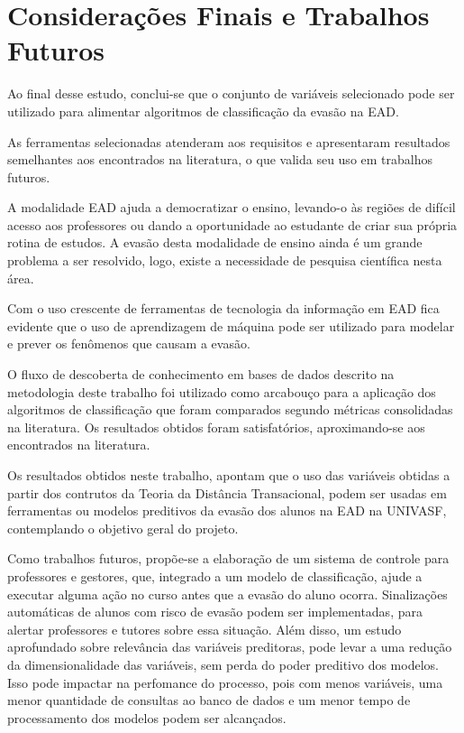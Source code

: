 \chapter{Considerações Finais e Trabalhos Futuros}

Ao final desse estudo, conclui-se que o conjunto de variáveis selecionado pode
ser utilizado para alimentar algoritmos de classificação da evasão na EAD.

As ferramentas selecionadas atenderam aos requisitos e apresentaram resultados
semelhantes aos encontrados na literatura, o que valida seu uso em trabalhos
futuros.

A modalidade EAD ajuda a democratizar o ensino, levando-o às regiões de difícil
acesso aos professores ou dando a oportunidade ao estudante de criar sua própria
rotina de estudos. A evasão desta modalidade de ensino ainda é um grande
problema a ser resolvido, logo, existe a necessidade de pesquisa científica
nesta área.

Com o uso crescente de ferramentas de tecnologia da informação em EAD fica
evidente que o uso de aprendizagem de máquina pode ser utilizado para modelar e
prever os fenômenos que causam a evasão.

O fluxo de descoberta de conhecimento em bases de dados descrito na metodologia
deste trabalho foi utilizado como arcabouço para a aplicação dos algoritmos de
classificação que foram comparados segundo métricas consolidadas na literatura.
Os resultados obtidos foram satisfatórios, aproximando-se aos encontrados na
literatura.

Os resultados obtidos neste trabalho, apontam que o uso das variáveis obtidas
a partir dos contrutos da Teoria da Distância Transacional, podem ser usadas
em ferramentas ou modelos preditivos da evasão dos alunos na EAD na UNIVASF,
contemplando o objetivo geral do projeto.

Como trabalhos futuros, propõe-se a elaboração de um sistema de controle para
professores e gestores, que, integrado a um modelo de classificação, ajude a
executar alguma ação no curso antes que a evasão do aluno ocorra. Sinalizações
automáticas de alunos com risco de evasão podem ser implementadas, para alertar
professores e tutores sobre essa situação. Além disso, um estudo aprofundado
sobre relevância das variáveis preditoras, pode levar a uma redução da
dimensionalidade das variáveis, sem perda do poder preditivo dos modelos. Isso
pode impactar na perfomance do processo, pois com menos variáveis, uma menor
quantidade de consultas ao banco de dados e um menor tempo de processamento dos
modelos podem ser alcançados.
